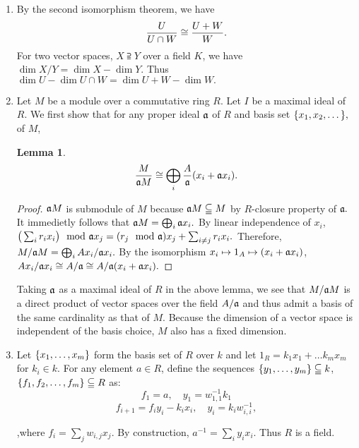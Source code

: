 \documentclass{article}
\newtheorem{lemma}[theorem]{Lemma}
\theoremstyle{definition}
\theoremstyle{remark}
\begin{document}
\begin{enumerate}[(1)]
	\item By the second isomorphism theorem,  we have 
    $$\dfrac{U}{U \cap W} \cong \dfrac{U + W}{W}.$$
    For two vector spaces, $X \supseteqq Y$ over a field $K$, we have $\dim X/Y = \dim X - \dim Y$. Thus $\dim U - \dim U \cap W = \dim U + W  - \dim W.$

    \item Let $M$ be a module over a commutative ring $R$. Let $I$ be a maximal ideal of $R$. We first show that for any proper ideal $\mathfrak{a}$ of $R$ and basis set $\{x_1, x_2, \dots\},$ of $M$,
    \begin{lemma}
        $$\frac{M}{\mathfrak{a}M} \cong \bigoplus_{i}\frac{A}{\mathfrak{a}}(x_i + \mathfrak{a}x_i).$$
    \end{lemma}
    \begin{proof}
        $\mathfrak{a}M$ is submodule of $M$ because $\mathfrak{a} M \subseteqq M$ by $R$-closure property of $\mathfrak{a}.$ It immedietly follows that $\mathfrak{a}M = \bigoplus_i \mathfrak{a} x_i.$ By linear independence of $x_i$, $\big(\sum_i r_ix_i\big) \mod \I ax_j = (r_j \mod \I a)x_j + \sum_{i \neq j} r_ix_i.$ Therefore, $M/\mathfrak{a} M = \bigoplus_i Ax_i/\mathfrak{a}x_i.$ By the isomorphism $x_i \mapsto 1_A \mapsto (x_i + \mathfrak{a}x_i)$,  $Ax_i/\mathfrak{a}x_i \cong A/\mathfrak{a} \cong A/\mathfrak{a} ( x_i + \mathfrak{a}x_i).$
    \end{proof}

    Taking $\mathfrak{a}$ as a maximal ideal of $R$ in the above lemma, we see that $M/\mathfrak{a}M$ is a direct product of vector spaces over the field $A/\mathfrak{a}$ and thus admit a basis of the same cardinality  as that of $M$. Because the dimension of a vector space is independent of the basis choice, $M$ also has a fixed dimension.

    \item Let $\{x_1, \dots, x_m\}$ form the basis set of $R$ over $k$ and let $1_R = k_1x_1 + \dots k_mx_m$ for $k_i \in k.$ For any element $a \in R$, define the sequences $\{y_1, \dots, y_m\} \subseteqq k$, $\{f_1, f_2, \dots, f_m\} \subseteqq R$ as: 
        $$f_1 = a, \quad y_1 = w_{1,1}^{-1}k_1 $$
        $$f_{i+1} = f_iy_i - k_ix_i, \quad  y_{i} = k_iw_{i, i}^{-1},$$

    ,where $f_i = \sum_j w_{i, j}x_j.$ By construction, $a^{-1} = \sum_i y_ix_i.$ Thus $R$ is a field.


\end{enumerate}
\end{document}
